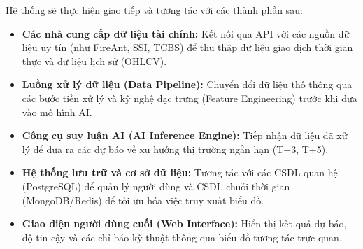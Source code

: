 \documentclass[12pt, a4paper]{article}
\begin{document}
Hệ thống sẽ thực hiện giao tiếp và tương tác với các thành phần sau:
\begin{itemize}
    \item \textbf{Các nhà cung cấp dữ liệu tài chính:} Kết nối qua API với các nguồn dữ liệu uy tín (như FireAnt, SSI, TCBS) để thu thập dữ liệu giao dịch thời gian thực và dữ liệu lịch sử (OHLCV).
    \item \textbf{Luồng xử lý dữ liệu (Data Pipeline):} Chuyển đổi dữ liệu thô thông qua các bước tiền xử lý và kỹ nghệ đặc trưng (Feature Engineering) trước khi đưa vào mô hình AI.
    \item \textbf{Công cụ suy luận AI (AI Inference Engine):} Tiếp nhận dữ liệu đã xử lý để đưa ra các dự báo về xu hướng thị trường ngắn hạn (T+3, T+5).
    \item \textbf{Hệ thống lưu trữ và cơ sở dữ liệu:} Tương tác với các CSDL quan hệ (PostgreSQL) để quản lý người dùng và CSDL chuỗi thời gian (MongoDB/Redis) để tối ưu hóa việc truy xuất biểu đồ.
    \item \textbf{Giao diện người dùng cuối (Web Interface):} Hiển thị kết quả dự báo, độ tin cậy và các chỉ báo kỹ thuật thông qua biểu đồ tương tác trực quan.
\end{itemize}
\end{document}
